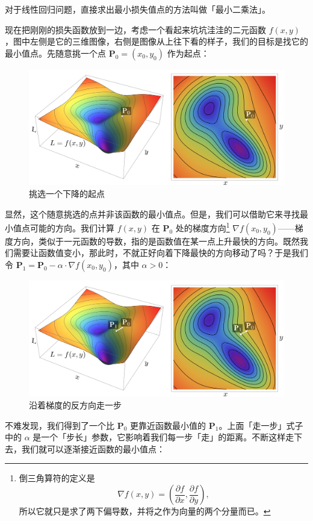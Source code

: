 \begin{note}
  对于线性回归问题，直接求出最小损失值点的方法叫做「最小二乘法」。
\end{note}

现在把刚刚的损失函数放到一边，考虑一个看起来坑坑洼洼的二元函数 $f(x,y)$，图中左侧是它的三维图像，右侧是图像从上往下看的样子，我们的目标是找它的最小值点。先随意挑一个点 $\mathbf{P}_0 = (x_0, y_0)$ 作为起点：

\begin{figure}[htb!]
  \centering
  \includegraphics[width=.68\textwidth]{assets/surpass/GD_1.png}
  \caption{挑选一个下降的起点}
  \label{fig:GD_1}
\end{figure}

显然，这个随意挑选的点并非该函数的最小值点。但是，我们可以借助它来寻找最小值点可能的方向。我们计算 $f(x,y)$ 在 $\mathbf{P}_0$ 处的梯度方向\footnote{倒三角算符的定义是\[\nabla f(x,y) = \left( \frac{\partial f}{\partial x} , \frac{\partial f}{\partial y} \right),\]所以它就只是求了两下偏导数，并将之作为向量的两个分量而已。} $\nabla f(x_0, y_0)$——梯度方向，类似于一元函数的导数，指的是函数值在某一点上升最快的方向。既然我们需要让函数值变小，那此时，不就正好向着下降最快的方向移动了吗？于是我们令 $\mathbf{P}_1 = \mathbf{P}_0 - \alpha \cdot \nabla f(x_0, y_0)$，其中 $\alpha > 0$：

\begin{figure}[htb!]
  \centering
  \includegraphics[width=.68\textwidth]{assets/surpass/GD_2.png}
  \caption{沿着梯度的反方向走一步}
  \label{fig:GD_2}
\end{figure}

不难发现，我们得到了一个比 $\mathbf{P}_0$ 更靠近函数最小值的 $\mathbf{P}_1$。上面「走一步」式子中的 $\alpha$ 是一个「步长」参数，它影响着我们每一步「走」的距离。不断这样走下去，我们就可以逐渐接近函数的最小值点：

